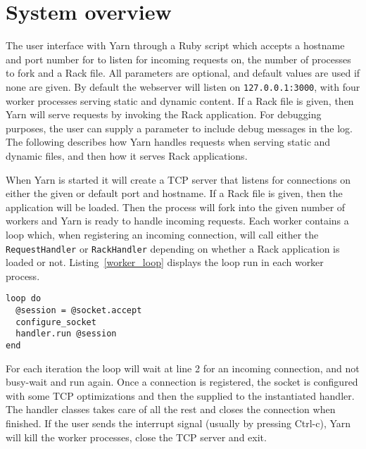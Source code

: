 \section{System overview}

The user interface with Yarn through a Ruby script which accepts a
hostname and port number for to listen for incoming requests on, the number
of processes to fork and a Rack file. All parameters are optional, and default
values are used if none are given. By default the webserver will listen on
\texttt{127.0.0.1:3000}, with four worker processes serving static and dynamic
content. If a Rack file is given, then Yarn will serve requests by invoking
the Rack application. For debugging purposes, the user can supply a parameter
to include debug messages in the log. The following describes how Yarn handles
requests when serving static and dynamic files, and then how it serves Rack
applications.

When Yarn is started it will create a TCP server that listens for connections
on either the given or default port and hostname. If a Rack file is given,
then the application will be loaded. Then the process will fork into the given
number of workers and Yarn is ready to handle incoming requests. Each worker
contains a loop which, when registering an incoming connection, will call
either the \texttt{RequestHandler} or \texttt{RackHandler} depending on
whether a Rack application is loaded or not. Listing~\ref{worker_loop}
displays the loop run in each worker process.

\newpage
\begin{lstlisting}[label=worker_loop,caption=Worker loop
(Yarn/lib/yarn/server.rb:90)]
loop do
  @session = @socket.accept
  configure_socket
  handler.run @session
end
\end{lstlisting}

For each iteration the loop will wait at line 2 for an incoming connection,
and not busy-wait and run again. Once a connection is registered, the socket
is configured with some TCP optimizations and then the supplied to the
instantiated handler. The handler classes takes care of all the
rest and closes the connection when finished. If the user sends
the interrupt signal (usually by pressing Ctrl-c), Yarn will kill the worker
processes, close the TCP server and exit.
